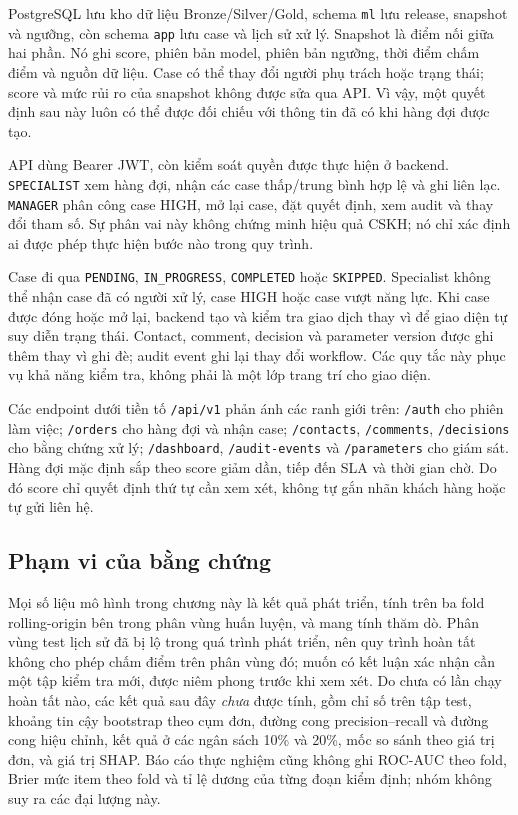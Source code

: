 \documentclass[12pt,a4paper]{report}
\begin{document}
PostgreSQL lưu kho dữ liệu Bronze/Silver/Gold, schema \texttt{ml} lưu release, snapshot và ngưỡng, còn schema \texttt{app} lưu case và lịch sử xử lý. Snapshot là điểm nối giữa hai phần. Nó ghi score, phiên bản model, phiên bản ngưỡng, thời điểm chấm điểm và nguồn dữ liệu. Case có thể thay đổi người phụ trách hoặc trạng thái; score và mức rủi ro của snapshot không được sửa qua API. Vì vậy, một quyết định sau này luôn có thể được đối chiếu với thông tin đã có khi hàng đợi được tạo.

API dùng Bearer JWT, còn kiểm soát quyền được thực hiện ở backend. \texttt{SPECIALIST} xem hàng đợi, nhận các case thấp/trung bình hợp lệ và ghi liên lạc. \texttt{MANAGER} phân công case HIGH, mở lại case, đặt quyết định, xem audit và thay đổi tham số. Sự phân vai này không chứng minh hiệu quả CSKH; nó chỉ xác định ai được phép thực hiện bước nào trong quy trình.

Case đi qua \texttt{PENDING}, \texttt{IN\_PROGRESS}, \texttt{COMPLETED} hoặc \texttt{SKIPPED}. Specialist không thể nhận case đã có người xử lý, case HIGH hoặc case vượt năng lực. Khi case được đóng hoặc mở lại, backend tạo và kiểm tra giao dịch thay vì để giao diện tự suy diễn trạng thái. Contact, comment, decision và parameter version được ghi thêm thay vì ghi đè; audit event ghi lại thay đổi workflow. Các quy tắc này phục vụ khả năng kiểm tra, không phải là một lớp trang trí cho giao diện.

Các endpoint dưới tiền tố \texttt{/api/v1} phản ánh các ranh giới trên: \texttt{/auth} cho phiên làm việc; \texttt{/orders} cho hàng đợi và nhận case; \texttt{/contacts}, \texttt{/comments}, \texttt{/decisions} cho bằng chứng xử lý; \texttt{/dashboard}, \texttt{/audit-events} và \texttt{/parameters} cho giám sát. Hàng đợi mặc định sắp theo score giảm dần, tiếp đến SLA và thời gian chờ. Do đó score chỉ quyết định thứ tự cần xem xét, không tự gắn nhãn khách hàng hoặc tự gửi liên hệ.

\subsection{Phạm vi của bằng chứng}\label{subsec:res-scope}

Mọi số liệu mô hình trong chương này là kết quả phát triển, tính trên ba fold rolling-origin bên trong phân vùng huấn luyện, và mang tính thăm dò. Phân vùng test lịch sử đã bị lộ trong quá trình phát triển, nên quy trình hoàn tất không cho phép chấm điểm trên phân vùng đó; muốn có kết luận xác nhận cần một tập kiểm tra mới, được niêm phong trước khi xem xét. Do chưa có lần chạy hoàn tất nào, các kết quả sau đây \emph{chưa} được tính, gồm chỉ số trên tập test, khoảng tin cậy bootstrap theo cụm đơn, đường cong precision--recall và đường cong hiệu chỉnh, kết quả ở các ngân sách 10\% và 20\%, mốc so sánh theo giá trị đơn, và giá trị SHAP. Báo cáo thực nghiệm cũng không ghi ROC-AUC theo fold, Brier mức item theo fold và tỉ lệ dương của từng đoạn kiểm định; nhóm không suy ra các đại lượng này.
\end{document}

